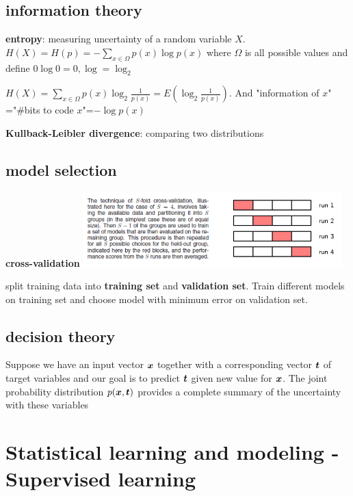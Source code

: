 \documentclass[11pt]{article}
\begin{document}
\subsection{information theory}
\label{sec:orge6357ba}
\textbf{entropy}: measuring uncertainty of a random variable \(X\).
\(H(X)=H(p)=-\displaystyle\sum_{x\in\Omega}p(x)\log p(x)\) where \(\Omega\) is
all possible values and define \(0\log0=0,\log=\log_2\)

\(H(X)=\displaystyle\sum_{x\in\Omega}p(x)\log_2\frac{1}{p(x)}=
   E(\log_2\frac{1}{p(x)})\). And "information of \(x\)"​="\#bits to code \(x\)"​=\(-\log
   p(x)\)

\textbf{Kullback-Leibler divergence}: comparing two distributions
\subsection{model selection}
\label{sec:orgaa8d80a}
\textbf{cross-validation}
\includegraphics[width=100mm]{CrossValidation}

split training data into \textbf{training set} and \textbf{validation set}. Train different
models on training set and choose model with minimum error on validation set.
\subsection{decision theory}
\label{sec:org91d5478}
Suppose we have an input vector \(\boldsymbol{x}\) together with a corresponding vector
\(\boldsymbol{t}\) of target variables and our goal is to predict \(\boldsymbol{t}\) given new
value for \(\boldsymbol{x}\). The joint probability distribution \(p(\boldsymbol{x},\boldsymbol{t})\)
provides a complete summary of the uncertainty with these variables
\section{Statistical learning and modeling - Supervised learning}
\label{sec:org56eea98}
\end{document}
